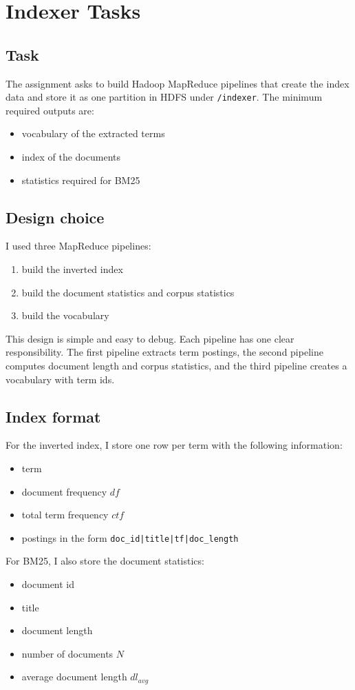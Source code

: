 \documentclass[12pt]{article}
\begin{document}
\section{Indexer Tasks}
\subsection{Task}
The assignment asks to build Hadoop MapReduce pipelines that create the index data and store it as one partition in HDFS under \texttt{/indexer}. The minimum required outputs are:
\begin{itemize}
    \item vocabulary of the extracted terms
    \item index of the documents
    \item statistics required for BM25
\end{itemize}

\subsection{Design choice}
I used three MapReduce pipelines:
\begin{enumerate}
    \item build the inverted index
    \item build the document statistics and corpus statistics
    \item build the vocabulary
\end{enumerate}

This design is simple and easy to debug. Each pipeline has one clear responsibility. The first pipeline extracts term postings, the second pipeline computes document length and corpus statistics, and the third pipeline creates a vocabulary with term ids.

\subsection{Index format}
For the inverted index, I store one row per term with the following information:
\begin{itemize}
    \item term
    \item document frequency \(df\)
    \item total term frequency \(ctf\)
    \item postings in the form \texttt{doc\_id|title|tf|doc\_length}
\end{itemize}

For BM25, I also store the document statistics:
\begin{itemize}
    \item document id
    \item title
    \item document length
    \item number of documents \(N\)
    \item average document length \(dl_{avg}\)
\end{itemize}
\end{document}

